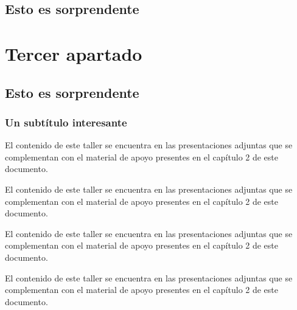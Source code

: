 \documentclass[12pt]{report}
\begin{document}
   \subsection{Esto es sorprendente}
   \lipsum[2]
\section{Tercer apartado}
\subsection{Esto es sorprendente}
\lipsum[3-4]
\subsubsection{Un subtítulo interesante}
\lipsum[5-7]
El contenido de este taller se encuentra en las presentaciones adjuntas que se
complementan con el material de apoyo presentes en el capítulo 2 de este
documento.\cite{Met78}

El contenido de este taller se encuentra en las presentaciones adjuntas que se
complementan con el material de apoyo presentes en el capítulo 2 de este
documento.\cite{Wel03}

El contenido de este taller se encuentra en las presentaciones adjuntas que se
complementan con el material de apoyo presentes en el capítulo 2 de este
documento.\cite{Lit96}

El contenido de este taller se encuentra en las presentaciones adjuntas que se
complementan con el material de apoyo presentes en el capítulo 2 de este
documento.\cite{Tho98w}








\end{document}
